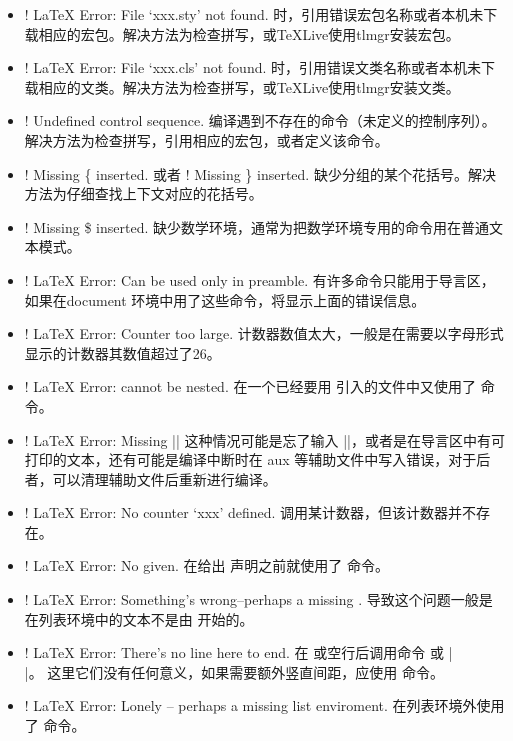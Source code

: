 \begin{itemize}
  \item
    ! LaTeX Error: File `xxx.sty' not found.
    时，引用错误宏包名称或者本机未下载相应的宏包。解决方法为检查拼写，或TeXLive使用tlmgr安装宏包。
  \item
    ! LaTeX Error: File `xxx.cls' not found.
    时，引用错误文类名称或者本机未下载相应的文类。解决方法为检查拼写，或TeXLive使用tlmgr安装文类。
  \item
    ! Undefined control sequence.
    编译遇到不存在的命令（未定义的控制序列）。解决方法为检查拼写，引用相应的宏包，或者定义该命令。
  \item
    ! Missing \{ inserted. 或者 ! Missing \} inserted.
    缺少分组的某个花括号。解决方法为仔细查找上下文对应的花括号。
  \item
    ! Missing \$ inserted.
    缺少数学环境，通常为把数学环境专用的命令用在普通文本模式。
  \item
    ! LaTeX Error: Can be used only in preamble.
    有许多命令只能用于导言区，如果在document
    环境中用了这些命令，将显示上面的错误信息。
  \item
    ! LaTeX Error: Counter too large.
    计数器数值太大，一般是在需要以字母形式显示的计数器其数值超过了26。
  \item
    ! LaTeX Error:  cannot be nested.
    在一个已经要用  引入的文件中又使用了
     命令。
  \item
    ! LaTeX Error: Missing ||
    这种情况可能是忘了输入 ||，或者是在导言区中有可打印的文本，还有可能是编译中断时在
    aux 等辅助文件中写入错误，对于后者，可以清理辅助文件后重新进行编译。
  \item
    ! LaTeX Error: No counter `xxx' defined.
    调用某计数器，但该计数器并不存在。
  \item
    ! LaTeX Error: No  given. 在给出
     声明之前就使用了  命令。
  \item
    ! LaTeX Error: Something's wrong--perhaps a missing .
    导致这个问题一般是在列表环境中的文本不是由  开始的。
  \item
    ! LaTeX Error: There's no line here to end.
    在  或空行后调用命令  或 |\\|。
    这里它们没有任何意义，如果需要额外竖直间距，应使用  命令。
  \item
    ! LaTeX Error: Lonely  -- perhaps a missing list enviroment.
    在列表环境外使用了  命令。
\end{itemize}
